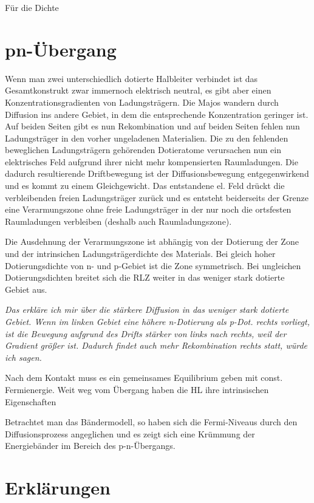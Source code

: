 \documentclass[paper=a4,10pt]{scrartcl}
\begin{document}
Für die Dichte 	


\section{pn-Übergang}
Wenn man zwei unterschiedlich dotierte Halbleiter verbindet ist das Gesamtkonstrukt zwar immernoch elektrisch neutral, es gibt aber einen Konzentrationsgradienten von Ladungsträgern. Die Majos wandern durch Diffusion ins andere Gebiet, in dem die entsprechende Konzentration geringer ist. Auf beiden Seiten gibt es nun Rekombination und auf beiden Seiten fehlen nun Ladungsträger in den vorher ungeladenen Materialien. Die zu den fehlenden beweglichen Ladungsträgern gehörenden Dotieratome verursachen nun ein elektrisches Feld aufgrund ihrer nicht mehr kompensierten Raumladungen. Die dadurch resultierende Driftbewegung ist der Diffusionsbewegung entgegenwirkend und es kommt zu einem Gleichgewicht. Das entstandene el. Feld drückt die verbleibenden freien Ladungsträger zurück und es entsteht beiderseits der Grenze eine Verarmungszone ohne freie Ladungsträger in der nur noch die ortsfesten Raumladungen verbleiben (deshalb auch Raumladungszone).

Die Ausdehnung der Verarmungszone ist abhängig von der Dotierung der Zone und der intrinsichen Ladungsträgerdichte des Materials. Bei gleich hoher Dotierungsdichte von n- und p-Gebiet ist die Zone symmetrisch. Bei ungleichen Dotierungsdichten breitet sich die RLZ weiter in das weniger stark dotierte Gebiet aus.

\textit{Das erkläre ich mir über die stärkere Diffusion in das weniger stark dotierte Gebiet. Wenn im linken Gebiet eine höhere n-Dotierung als p-Dot. rechts vorliegt, ist die Bewegung aufgrund des Drifts stärker von links nach rechts, weil der Gradient größer ist. Dadurch findet auch mehr Rekombination rechts statt, würde ich sagen.}

Nach dem Kontakt muss es ein gemeinsames Equilibrium geben mit const. Fermienergie. Weit weg vom Übergang haben die HL ihre intrinsischen Eigenschaften

Betrachtet man das Bändermodell, so haben sich die Fermi-Niveaus durch den Diffusionsprozess angeglichen und es zeigt sich eine Krümmung der Energiebänder im Bereich des p-n-Übergangs.




\section{Erklärungen}
\end{document}
